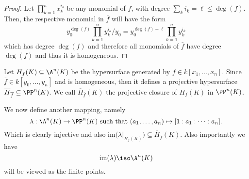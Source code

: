 \begin{proof}
   Let \(\prod_{k=1}^n x_k^{i_k}\) be any monomial of \(f\), with degree
   \(\sum_k i_k = \ell \leqslant \deg(f)\). Then, the respective monomial in
   \(\overline{f}\) will have the form \[y_0^{\deg(f)}\prod_{k=1}^n
   y_k^{i_k}/y_0 = y_0^{\deg(f) - \ell} \prod_{k=1}^n y_k^{i_k}\] which
   has degree \(\deg(f)\) and therefore all monomials of \(\overline{f}\) have
   degree \(\deg(f)\) and thus it is homogeneous.
\end{proof}

\begin{definition}
   Let \(H_f(K) \subseteq \A^n(K)\) be the hypersurface generated by \(f \in
   k[x_1, \dots, x_n]\).  Since  \(\overline{f} \in k[y_0, \dots, y_n]\) and is
   homogeneous, then it defines a projective hypersurface
   \(\overline{H}_{\overline{f}} \subseteq \PP^n(K)\). We call
   \(\overline{H}_{\overline{f}}(K)\) the projective closure of \(H_f(K)\) in
   \(\PP^n(K)\).
\end{definition}

\begin{definition}
   We now define another mapping, namely
   \[
      \lambda : \A^n(K) \to \PP^n(K) \text{ such that } (a_1, \dots, a_n)
      \mapsto [1 : a_1 : \cdots : a_n].
   \] 
   Which is clearly injective and also \(\mathrm{im}\big(
   \lambda\big|_{H_f(K)}\big) \subseteq \overline{H}_{\overline{f}}(K)\). Also
   importantly we have 
   \[
      \mathrm{im}(\lambda) \iso \A^n(K)
   \] 
   will be viewed as the finite points.
\end{definition}

